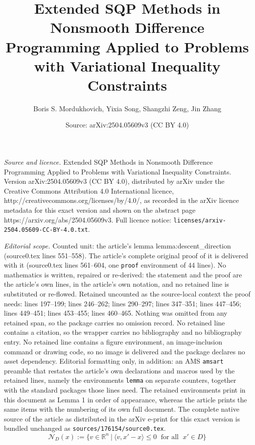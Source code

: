 \documentclass[10pt,a4paper]{amsart}
\title{Extended SQP Methods in Nonsmooth Difference Programming Applied to Problems with Variational Inequality Constraints}
\author{Boris S. Mordukhovich, Yixia Song, Shangzhi Zeng, Jin Zhang}
\date{Source: arXiv:2504.05609v3 (CC BY 4.0)}
\begin{document}
\maketitle

\noindent\emph{Source and licence.} Extended SQP Methods in Nonsmooth Difference Programming Applied to Problems with Variational Inequality Constraints. Version arXiv:2504.05609v3 (CC BY 4.0), distributed by arXiv under the Creative Commons Attribution 4.0 International licence, http://creativecommons.org/licenses/by/4.0/, as recorded in the arXiv licence metadata for this exact version and shown on the abstract page https://arxiv.org/abs/2504.05609v3. Full licence notice: \texttt{licenses/arxiv-2504.05609-CC-BY-4.0.txt}.\par\smallskip

\noindent\textit{Editorial scope.} Counted unit: the article's lemma lemma:descent\_direction (source0.tex lines 551--558). The article's complete original proof of it is delivered with it (source0.tex lines 561--604, one \texttt{proof} environment of 44 lines). No mathematics is written, repaired or re-derived: the statement and the proof are the article's own lines, in the article's own notation, and no retained line is substituted or re-flowed.  Retained uncounted as the source-local context the proof needs: lines 197--199; lines 246--262; lines 290--297; lines 347--351; lines 447--456; lines 449--451; lines 453--455; lines 460--465.  Nothing was omitted from any retained span, so the package carries no omission record.  No retained line contains a citation, so the wrapper carries no bibliography and no bibliography entry.  No retained line contains a figure environment, an image-inclusion command or drawing code, so no image is delivered and the package declares no asset dependency.  Editorial formatting only, in addition: an AMS \texttt{amsart} preamble that restates the article's own declarations and macros used by the retained lines, namely the environments \texttt{lemma} on separate counters, together with the standard packages those lines need.  The retained environments print in this document as Lemma 1 in order of appearance, whereas the article prints the same items with the numbering of its own full document.  The complete native source of the article as distributed in the arXiv e-print for this exact version is bundled unchanged as \texttt{sources/176154/source0.tex}.
\begin{equation}\label{nc-conv}
\mathcal{N}_D(x) := \big\{ v \in \mathbb{R}^n ~\big|~ \langle v, x' - x\rangle \le 0\;\mbox{  for all }\;x' \in D\big\}
\end{equation}
\end{document}
